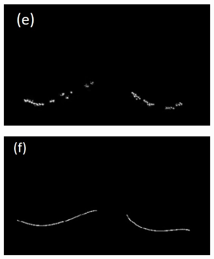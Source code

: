 \documentclass[]{spie}  %
\begin{document}
{\begin{figure}[htbp]
\begin{subfigure}
{\begin{minipage}[t]{0.30\linewidth}
  \includegraphics[width=\linewidth,trim={{.0\wd0} {.0\wd0} {.0\wd0} {.0\wd0}},clip]{Image/FissureDetection5.jpg}
  \centerline{}
	\label{fig:FissureDetection-e}
	\end{minipage}%
   }%
\end{subfigure}
\begin{subfigure}{
  \begin{minipage}[t]{0.305\linewidth}
  \includegraphics[width=\linewidth,trim={{.0\wd0} {.0\wd0} {.0\wd0} {.0\wd0}},clip]{Image/FissureDetection6.jpg}

\end{minipage}}
\end{subfigure}
\end{figure}}
\end{document}
